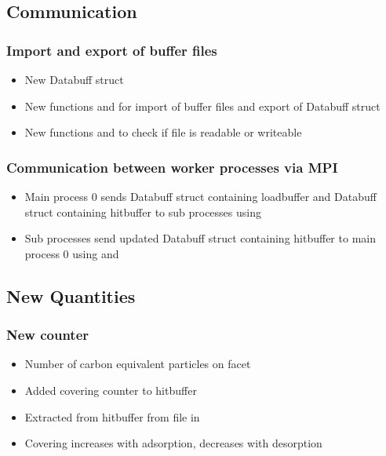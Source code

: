 \subsection{Communication}
\subsubsection{Import and export of buffer files}
\begin{itemize}[noitemsep,topsep=0pt]
\item New Databuff struct 
\item New functions  and  for import of buffer files and export of Databuff struct
\item New functions  and  to check if file is readable or writeable
\end{itemize}

\subsubsection{Communication between worker processes via MPI}
\begin{itemize}[noitemsep,topsep=0pt]
\item Main process 0 sends Databuff struct containing loadbuffer and Databuff struct containing hitbuffer to sub processes using 
\item Sub processes send updated Databuff struct containing hitbuffer to main process 0 using  and 
\end{itemize}

\subsection{New Quantities}
\label{sub:quant}
\subsubsection{New counter }
\begin{itemize}[noitemsep,topsep=0pt]
\item Number of carbon equivalent particles on facet
\item Added covering counter to hitbuffer
\item Extracted from hitbuffer from  file in 
\item Covering increases with adsorption, decreases with desorption
\end{itemize}

